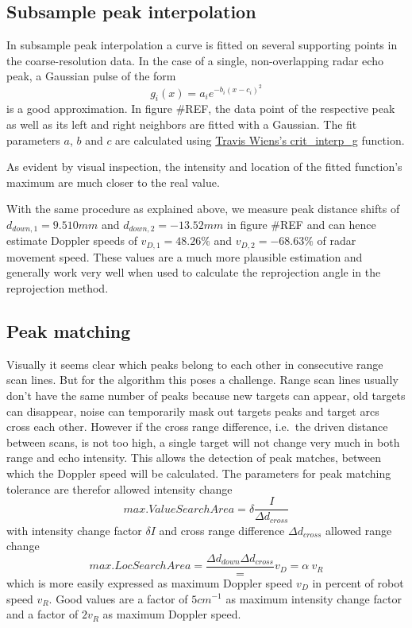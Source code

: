 \subsection{Subsample peak
interpolation}\label{subsample-peak-interpolation}

In subsample peak interpolation a curve is fitted on several supporting
points in the coarse-resolution data. In the case of a single,
non-overlapping radar echo peak, a Gaussian pulse of the form
\[g_i(x) = a_i e^{-b_i ( x - c_i )^2}\] is a good approximation. In
figure \#REF, the data point of the respective peak as well as its left
and right neighbors are fitted with a Gaussian. The fit parameters
\(a\), \(b\) and \(c\) are calculated using
\href{https://www.mathworks.com/matlabcentral/fileexchange/24465}{Travis
Wiens's crit\_interp\_g} function.

As evident by visual inspection, the intensity and location of the
fitted function's maximum are much closer to the real value.

With the same procedure as explained above, we measure peak distance
shifts of \(d_{down,1}=9.510mm\) and \(d_{down,2}=-13.52mm\) in figure
\#REF and can hence estimate Doppler speeds of \(v_{D,1}=48.26\%\) and
\(v_{D,2}=-68.63\%\) of radar movement speed. These values are a much
more plausible estimation and generally work very well when used to
calculate the reprojection angle in the reprojection method.

\subsection{Peak matching}\label{peak-matching}

Visually it seems clear which peaks belong to each other in consecutive
range scan lines. But for the algorithm this poses a challenge. Range
scan lines usually don't have the same number of peaks because new
targets can appear, old targets can disappear, noise can temporarily
mask out targets peaks and target arcs cross each other. However if the
cross range difference, i.e.~the driven distance between scans, is not
too high, a single target will not change very much in both range and
echo intensity. This allows the detection of peak matches, between which
the Doppler speed will be calculated. The parameters for peak matching
tolerance are therefor allowed intensity change
\[max. ValueSearchArea = \delta \frac{I}{\Delta d_{cross}}\] with
intensity change factor \(\delta I\) and cross range difference
\(\Delta d_{cross}\) allowed range change
\[max. LocSearchArea = \frac{\Delta d_{down}{\Delta d_{cross}}} = v_D = \alpha~v_R\]
which is more easily expressed as maximum Doppler speed \(v_D\) in
percent of robot speed \(v_R\). Good values are a factor of
\(5 cm^{-1}\) as maximum intensity change factor and a factor of
\(2 v_R\) as maximum Doppler speed.

